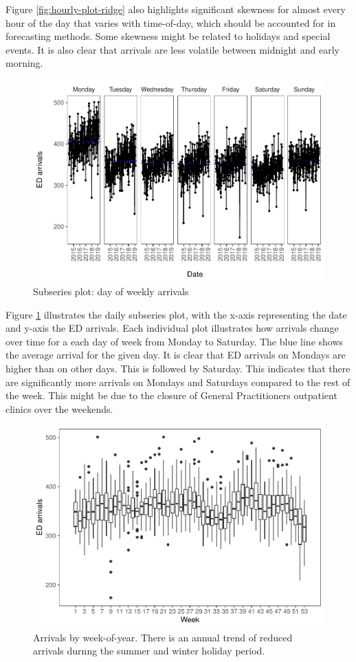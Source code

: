 \documentclass[]{elsarticle} %
\begin{document}
Figure \ref{fig:hourly-plot-ridge} also highlights significant skewness
for almost every hour of the day that varies with time-of-day, which
should be accounted for in forecasting methods. Some skewness might be
related to holidays and special events. It is also clear that arrivals
are less volatile between midnight and early morning.

\begin{figure}[H]

{\centering \includegraphics[width=0.7\linewidth]{paper_files/figure-latex/seasonplot-dofw-1} 

}

\caption{Subseries plot: day of weekly arrivals}\label{fig:seasonplot-dofw}
\end{figure}

Figure \ref{fig:seasonplot-dofw} illustrates the daily subseries plot, with the x-axis representing the date and y-axis
the ED arrivals. Each individual plot illustrates how arrivals change over time for a each day
of week from Monday to Saturday. The blue line shows the average arrival for the given day.
It is clear that ED arrivals on Mondays are higher than on other days. This is followed by
Saturday. This indicates that there are significantly more arrivals on Mondays and Saturdays
compared to the rest of the week. This might be due to the closure of General Practitioners
outpatient clinics over the weekends.

\begin{figure}[H]

{\centering \includegraphics[width=0.7\linewidth]{paper_files/figure-latex/seasonplot-weekofyear-1} 

}

\caption{Arrivals by week-of-year. There is an annual trend of reduced arrivals durnng the summer and winter holiday period.}\label{fig:seasonplot-weekofyear}
\end{figure}
\end{document}
